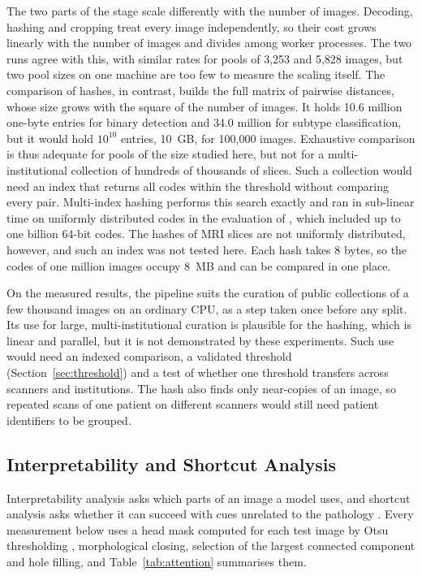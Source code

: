 \documentclass[a4paper,fleqn]{cas-sc}
\begin{document}
The two parts of the stage scale differently with the number of images. Decoding, hashing and cropping treat every image independently, so their cost grows linearly with the number of images and divides among worker processes. The two runs agree with this, with similar rates for pools of 3,253 and 5,828 images, but two pool sizes on one machine are too few to measure the scaling itself. The comparison of hashes, in contrast, builds the full matrix of pairwise distances, whose size grows with the square of the number of images. It holds 10.6 million one-byte entries for binary detection and 34.0 million for subtype classification, but it would hold $10^{10}$ entries, 10~GB, for 100,000 images. Exhaustive comparison is thus adequate for pools of the size studied here, but not for a multi-institutional collection of hundreds of thousands of slices. Such a collection would need an index that returns all codes within the threshold without comparing every pair. Multi-index hashing performs this search exactly and ran in sub-linear time on uniformly distributed codes in the evaluation of \citet{norouzi2014}, which included up to one billion 64-bit codes. The hashes of MRI slices are not uniformly distributed, however, and such an index was not tested here. Each hash takes 8 bytes, so the codes of one million images occupy 8~MB and can be compared in one place.

On the measured results, the pipeline suits the curation of public collections of a few thousand images on an ordinary CPU, as a step taken once before any split. Its use for large, multi-institutional curation is plausible for the hashing, which is linear and parallel, but it is not demonstrated by these experiments. Such use would need an indexed comparison, a validated threshold (Section~\ref{sec:threshold}) and a test of whether one threshold transfers across scanners and institutions. The hash also finds only near-copies of an image, so repeated scans of one patient on different scanners would still need patient identifiers to be grouped.

\subsection{Interpretability and Shortcut Analysis}
\label{sec:interpretability}

Interpretability analysis asks which parts of an image a model uses, and shortcut analysis asks whether it can succeed with cues unrelated to the pathology \citep{geirhos2020}. Every measurement below uses a head mask computed for each test image by Otsu thresholding \citep{otsu1979}, morphological closing, selection of the largest connected component and hole filling, and Table~\ref{tab:attention} summarises them.
\end{document}
